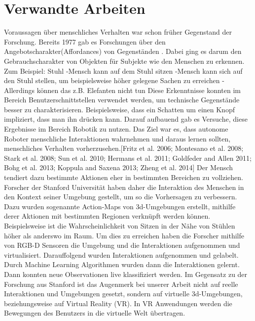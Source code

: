 \section{Verwandte Arbeiten}
Voraussagen über menschliches Verhalten war schon früher Gegenstand der Forschung. Bereits 1977 gab es Forschungen über den Angebotscharakter(Affordances) von Gegenständen \cite{gibson}. Dabei ging es darum den Gebrauchscharakter
von Objekten für Subjekte wie den Menschen zu erkennen.
\newline
Zum Beispiel:\newline
Stuhl\newline
 -Mensch kann auf dem Stuhl sitzen\newline
 -Mensch kann sich auf den Stuhl stellen, um beispielsweise höher gelegene Sachen zu erreichen \newline
 -Allerdings können das z.B. Elefanten nicht tun\newline
Diese Erkenntnisse konnten im Bereich Benutzerschnittstellen verwendet werden, um technische Gegenstände besser zu
charakterisieren. Beispielsweise, dass ein Schatten um einen Knopf impliziert, dass man ihn drücken kann.
\newline
\newline
Darauf aufbauend gab es Versuche, diese Ergebnisse im Bereich Robotik zu nutzen. Das Ziel war es, dass autonome Roboter menschliche
Interaktionen wahrnehmen und daraus lernen sollten, menschliches Verhalten vorherzusehen.[Fritz et al. 2006; Montesano et al. 2008; Stark
et al. 2008; Sun et al. 2010; Hermans et al. 2011; Goldfeder and
Allen 2011; Bohg et al. 2013; Koppula and Saxena 2013; Zheng
et al. 2014]
\newline
\newline
Der Mensch tendiert dazu bestimmte Aktionen eher in bestimmten Bereichen zu vollziehen. Forscher der Stanford Universität haben daher
die Interaktion des Menschen in den Kontext seiner Umgebung gestellt, um so die Vorhersagen zu verbessern. Dazu wurden sogenannte
Action-Maps von 3d-Umgebungen erstellt, mithilfe derer Aktionen mit bestimmten Regionen verknüpft werden können. Beispielsweise ist
die Wahrscheinlichkeit von Sitzen in der Nähe von Stühlen höher als anderswo im Raum.
Um dies zu erreichen haben die Forscher mithilfe von RGB-D Sensoren die Umgebung und die Interaktionen aufgenommen und virtualisiert.
Darauffolgend wurden Interaktionen aufgenommen und gelabelt. Durch Machine Learning Algorithmen wurden dann die Interaktionen gelernt.
Dann konnten neue Observationen live klassifiziert werden.
\newline
\newline
Im Gegensatz zu der Forschung aus Stanford ist das Augenmerk bei unserer Arbeit nicht auf reelle Interaktionen und Umgebungen gesetzt,
sondern auf virtuelle 3d-Umgebungen, beziehungsweise auf Virtual Reality (VR). In VR Anwendungen werden die Bewegungen des Benutzers
in die virtuelle Welt übertragen.



